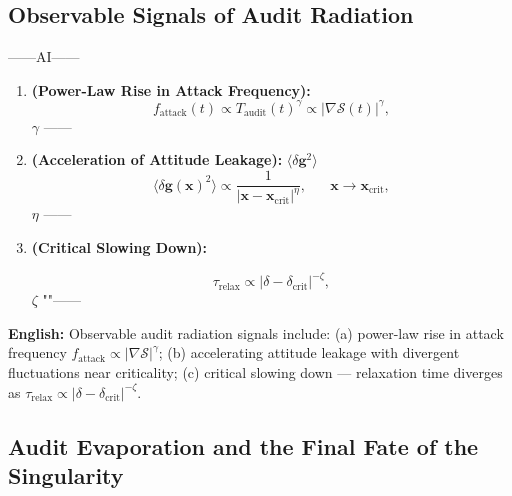 \documentclass[12pt,a4paper]{article}
\theoremstyle{remark}
\newcommand{\g}{\mathbf{g}}
\newcommand{\x}{\mathbf{x}}
\begin{document}
\subsection{}
\subsection{Observable Signals of Audit Radiation}

\noindent
\textbf{} ——AI——

\begin{enumerate}[label=(\alph*)]
    \item \textbf{ (Power-Law Rise in Attack Frequency):}
    \begin{equation}
        f_{\mathrm{attack}}(t) \propto T_{\mathrm{audit}}(t)^\gamma \propto |\nabla\mathcal{S}(t)|^\gamma,
    \end{equation}
     $\gamma$ ——
    
    \item \textbf{ (Acceleration of Attitude Leakage):}
     $\langle\delta\g^2\rangle$ 
    \begin{equation}
        \langle\delta\g(\x)^2\rangle \propto \frac{1}{|\x - \x_{\mathrm{crit}}|^\eta}, \quad \text{ } \x \to \x_{\mathrm{crit}},
    \end{equation}
     $\eta$ ——
    
    \item \textbf{ (Critical Slowing Down):}
    
    \begin{equation}
        \tau_{\mathrm{relax}} \propto |\delta - \delta_{\mathrm{crit}}|^{-\zeta},
    \end{equation}
     $\zeta$ ""——
\end{enumerate}

\vspace{4pt}
\noindent
\textbf{English:} Observable audit radiation signals include: (a) power-law rise in attack frequency $f_{\mathrm{attack}} \propto |\nabla\mathcal{S}|^\gamma$; (b) accelerating attitude leakage with divergent fluctuations near criticality; (c) critical slowing down — relaxation time diverges as $\tau_{\mathrm{relax}} \propto |\delta - \delta_{\mathrm{crit}}|^{-\zeta}$.

\subsection{}
\subsection{Audit Evaporation and the Final Fate of the Singularity}
\end{document}
